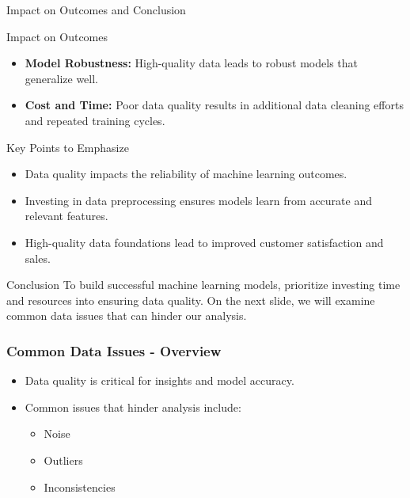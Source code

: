 \documentclass[aspectratio=169]{beamer}
\begin{document}
\begin{frame}[fragile]{Impact on Outcomes and Conclusion}
    \begin{block}{Impact on Outcomes}
        \begin{itemize}
            \item \textbf{Model Robustness:} High-quality data leads to robust models that generalize well.
            \item \textbf{Cost and Time:} Poor data quality results in additional data cleaning efforts and repeated training cycles.
        \end{itemize}
    \end{block}
    
    \begin{block}{Key Points to Emphasize}
        \begin{itemize}
            \item Data quality impacts the reliability of machine learning outcomes.
            \item Investing in data preprocessing ensures models learn from accurate and relevant features.
            \item High-quality data foundations lead to improved customer satisfaction and sales.
        \end{itemize}
    \end{block}
    
    \begin{block}{Conclusion}
        To build successful machine learning models, prioritize investing time and resources into ensuring data quality.
        On the next slide, we will examine common data issues that can hinder our analysis.
    \end{block}
\end{frame}

\begin{frame}[fragile]
    \frametitle{Common Data Issues - Overview}
    \begin{itemize}
        \item Data quality is critical for insights and model accuracy.
        \item Common issues that hinder analysis include:
        \begin{itemize}
            \item Noise
            \item Outliers
            \item Inconsistencies
        \end{itemize}
    \end{itemize}
\end{frame}
\end{document}
